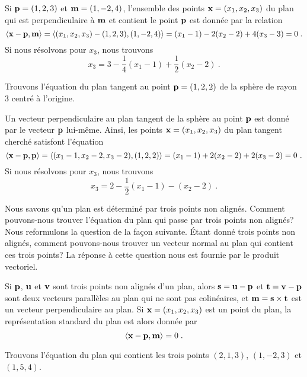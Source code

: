 {\begin{egg}
Si $\mathbf{p}=(1,2,3)$ et $\mathbf{m} = (1,-2,4)$, l'ensemble des points
$\mathbf{x}=(x_1,x_2,x_3)$ du plan qui est perpendiculaire à $\mathbf{m}$ et
contient le point $\mathbf{p}$ est donnée par la relation
\[
\left\langle{\mathbf{x}-\mathbf{p}} , {\mathbf{m}}\right\rangle =
\left\langle{(x_1,x_2,x_3) - (1,2,3)} , {(1,-2,4)}\right\rangle = (x_1-1) -2 (x_2-2) + 4(x_3-3) = 0 \; .
\]
Si nous résolvons pour $x_3$, nous trouvons
\[
x_3 = 3 - \frac{1}{4}(x_1-1)  + \frac{1}{2} (x_2-2) \ .
\]
\end{egg}

\begin{egg}
Trouvons l'équation du plan tangent au point $\mathbf{p}= (1,2,2)$ de la
sphère de rayon $3$ centré à l'origine.

Un vecteur perpendiculaire au plan tangent de la sphère au point
$\mathbf{p}$ est donné par le vecteur $\mathbf{p}$ lui-même.  Ainsi, les
points $\mathbf{x}=(x_1,x_2,x_3)$ du plan tangent cherché satisfont l'équation
\[
\ps{\VEC{x} - \VEC{p}}{\VEC{p}} = 
\ps{(x_1-1,x_2-2,x_3-2)}{(1,2,2)} = (x_1-1) + 2(x_2-2) + 2(x_3-2) = 0 \ .
\]
Si nous résolvons pour $x_3$, nous trouvons
\[
x_3 = 2 - \frac{1}{2}(x_1-1) - (x_2-2) \ .
\]
\label{TANG_PLANE}
\end{egg}

Nous savons qu'un plan est déterminé par trois points non alignés.
Comment pouvons-nous trouver l'équation du plan qui passe par trois points
non alignés?  Nous reformulons la question de la façon suivante. Étant
donné trois points non alignés, comment pouvons-nous trouver un vecteur
normal au plan qui contient ces trois points?  La réponse à cette
question nous est fournie par le produit vectoriel.

\begin{prop}
Si $\mathbf{p}$, $\mathbf{u}$ et $\mathbf{v}$ sont trois points non alignés
d'un plan, alors $\mathbf{s} = \mathbf{u} - \mathbf{p}$ et
$\mathbf{t} = \mathbf{v} - \mathbf{p}$ sont deux vecteurs parallèles au plan
qui ne sont pas colinéaires, et $\mathbf{m} = \mathbf{s} \times \mathbf{t}$ est un
vecteur perpendiculaire au plan.  Si $\mathbf{x} = (x_1,x_2,x_3)$ est un
point du plan, la représentation standard du plan est alors donnée par
\[
\left\langle{\mathbf{x} - \mathbf{p}} , {\mathbf{m}}\right\rangle = 0 \; .
\]
\end{prop}

\begin{egg}
Trouvons l'équation du plan qui contient les trois points $(2,1,3)$,
$(1,-2,3)$ et $(1,5,4)$.


\end{egg}}
